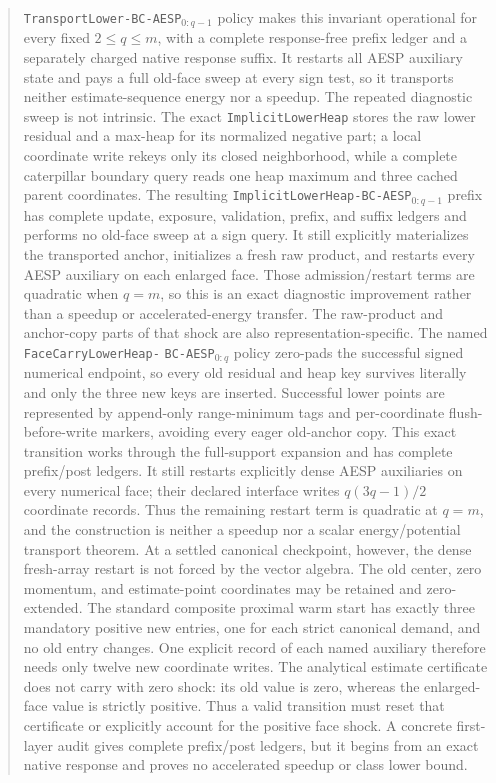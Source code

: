 \documentclass[11pt]{article}
\begin{document}
\begin{abstract}
\texttt{TransportLower-BC-AESP}$_{0:q-1}$ policy makes this invariant
operational for every fixed $2\leq q\leq m$, with a complete response-free
prefix ledger and a separately charged native response suffix.  It restarts
all AESP auxiliary state and pays a full old-face sweep at every sign test, so
it transports neither estimate-sequence energy nor a speedup.
The repeated diagnostic sweep is not intrinsic.  The exact
\texttt{ImplicitLowerHeap} stores the raw lower residual and a max-heap for
its normalized negative part; a local coordinate write rekeys only its closed
neighborhood, while a complete caterpillar boundary query reads one heap
maximum and three cached parent coordinates.  The resulting
\texttt{ImplicitLowerHeap-BC-AESP}$_{0:q-1}$ prefix has complete update,
exposure, validation, prefix, and suffix ledgers and performs no old-face
sweep at a sign query.  It still explicitly materializes the transported
anchor, initializes a fresh raw product, and restarts every AESP auxiliary on
each enlarged face.  Those admission/restart terms are quadratic when
$q=m$, so this is an exact diagnostic improvement rather than a speedup or
accelerated-energy transfer.
The raw-product and anchor-copy parts of that shock are also
representation-specific.  The named
\texttt{FaceCarry}\allowbreak\texttt{LowerHeap-}\allowbreak
\texttt{BC-AESP}$_{0:q}$ policy
zero-pads the successful signed numerical endpoint, so every old residual
and heap key survives literally and only the three new keys are inserted.
Successful lower points are represented by append-only range-minimum tags and
per-coordinate flush-before-write markers, avoiding every eager old-anchor
copy.  This exact transition works through the full-support expansion and has
complete prefix/post ledgers.  It still restarts explicitly dense AESP
auxiliaries on every numerical face; their declared interface writes
$q(3q-1)/2$ coordinate records.  Thus the remaining restart term is
quadratic at $q=m$, and the construction is neither a speedup nor a scalar
energy/potential transport theorem.
At a settled canonical checkpoint, however, the dense fresh-array restart is
not forced by the vector algebra.  The old center, zero momentum, and
estimate-point coordinates may be retained and zero-extended.  The standard
composite proximal warm start has exactly three mandatory positive new
entries, one for each strict canonical demand, and no old entry changes.  One
explicit record of each named auxiliary therefore needs only twelve new
coordinate writes.  The analytical estimate certificate does not carry with
zero shock: its old value is zero, whereas the enlarged-face value is
strictly positive.  Thus a valid transition must reset that certificate or
explicitly account for the positive face shock.  A concrete first-layer
audit gives complete prefix/post ledgers, but it begins from an exact native
response and proves no accelerated speedup or class lower bound.
\end{abstract}
\end{document}
